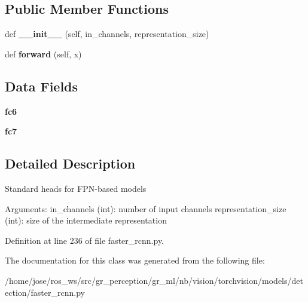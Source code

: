 \subsection*{Public Member Functions}
\begin{DoxyCompactItemize}
\item 
\mbox{\label{classtorchvision_1_1models_1_1detection_1_1faster__rcnn_1_1TwoMLPHead_a3b6fc29603bc92c60f75a820a70d0506}} 
def {\bfseries \+\_\+\+\_\+init\+\_\+\+\_\+} (self, in\+\_\+channels, representation\+\_\+size)
\item 
\mbox{\label{classtorchvision_1_1models_1_1detection_1_1faster__rcnn_1_1TwoMLPHead_a16ef7c2f5a7c79da14818e7ae7a4894d}} 
def {\bfseries forward} (self, x)
\end{DoxyCompactItemize}
\subsection*{Data Fields}
\begin{DoxyCompactItemize}
\item 
\mbox{\label{classtorchvision_1_1models_1_1detection_1_1faster__rcnn_1_1TwoMLPHead_a0b0fe786473979e1fbff9f2d2a935f5f}} 
{\bfseries fc6}
\item 
\mbox{\label{classtorchvision_1_1models_1_1detection_1_1faster__rcnn_1_1TwoMLPHead_af416fcdfe059c12aea662206b5abd7b9}} 
{\bfseries fc7}
\end{DoxyCompactItemize}


\subsection{Detailed Description}
\begin{DoxyVerb}Standard heads for FPN-based models

Arguments:
    in_channels (int): number of input channels
    representation_size (int): size of the intermediate representation
\end{DoxyVerb}
 

Definition at line 236 of file faster\+\_\+rcnn.\+py.



The documentation for this class was generated from the following file\+:\begin{DoxyCompactItemize}
\item 
/home/jose/ros\+\_\+ws/src/gr\+\_\+perception/gr\+\_\+ml/nb/vision/torchvision/models/detection/faster\+\_\+rcnn.\+py\end{DoxyCompactItemize}
